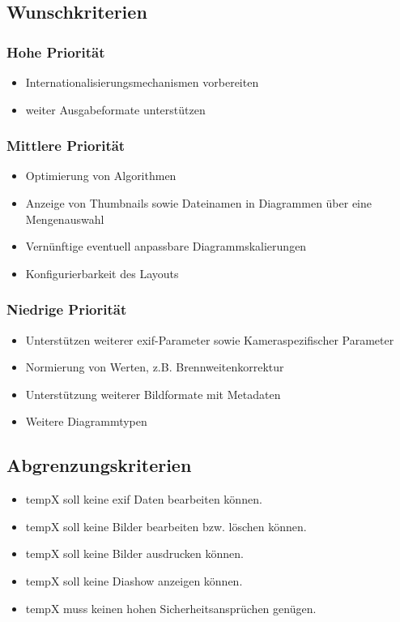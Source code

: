 \subsection{Wunschkriterien} 
\subsubsection{Hohe Priorität}
	\begin{itemize}
	\item Internationalisierungsmechanismen vorbereiten
	\item weiter Ausgabeformate unterstützen 
	\end{itemize}
\subsubsection{Mittlere Priorität}
	\begin{itemize}
	\item Optimierung von Algorithmen
	\item Anzeige von Thumbnails sowie Dateinamen in Diagrammen über eine Mengenauswahl
	\item Vernünftige eventuell anpassbare Diagrammskalierungen
	\item Konfigurierbarkeit des Layouts	
	\end{itemize}
\subsubsection{Niedrige Priorität}
	\begin{itemize}
	\item Unterstützen weiterer \gls{exif}-Parameter sowie Kameraspezifischer Parameter
	\item Normierung von Werten, z.B. Brennweitenkorrektur
 	\item Unterstützung weiterer Bildformate mit Metadaten 	
 	\item Weitere Diagrammtypen
	\end{itemize}


\subsection{Abgrenzungskriterien} 
\begin{itemize}
	\item \gls{tempX} soll keine \gls{exif} Daten bearbeiten können.
	\item \gls{tempX} soll keine Bilder bearbeiten bzw. löschen können.
	\item \gls{tempX} soll keine Bilder ausdrucken können.
	\item \gls{tempX} soll keine Diashow anzeigen können.
	\item \gls{tempX} muss keinen hohen Sicherheitsansprüchen genügen.
\end{itemize}
